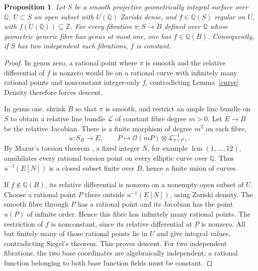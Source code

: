 \documentclass[11pt]{article}
\newtheorem{proposition}[theorem]{Proposition}
\theoremstyle{remark}\newtheorem{remark}[theorem]{Remark}
\newcommand{\Q}{\mathbb Q}\newcommand{\Z}{\mathbb Z}\newcommand{\R}{\mathbb R}
\begin{document}
\begin{proposition}\label{genus-one}
Let \(S\) be a smooth projective geometrically integral surface over \(\Q\), \(U\subset S\) an open subset with \(U(\Q)\) Zariski dense, and \(f\in\Q(S)\) regular on \(U\), with \(f(U(\Q))\subseteq\Z\). For every fibration \(\pi:S\to B\) defined over \(\Q\) whose geometric generic fibre has genus at most one, one has \(f\in\Q(B)\). Consequently, if \(S\) has two independent such fibrations, \(f\) is constant.
\end{proposition}
\begin{proof}
In genus zero, a rational point where \(\pi\) is smooth and the relative differential of \(f\) is nonzero would lie on a rational curve with infinitely many rational points and nonconstant integer-only \(f\), contradicting Lemma~\ref{curve}. Density therefore forces descent.

In genus one, shrink \(B\) so that \(\pi\) is smooth, and restrict an ample line bundle on \(S\) to obtain a relative line bundle \(\mathcal L\) of constant fibre degree \(m>0\). Let \(E\to B\) be the relative Jacobian. There is a finite morphism of degree \(m^2\) on each fibre,
\[
 u:S_B\longrightarrow E,\qquad
 P\longmapsto\mathcal O(mP)\otimes\mathcal L_{\pi(P)}^{-1}.
\]
By Mazur's torsion theorem \cite{Mazur}, a fixed integer \(N\), for example \(\operatorname{lcm}(1,\ldots,12)\), annihilates every rational torsion point on every elliptic curve over \(\Q\). Thus \(u^{-1}(E[N])\) is a closed subset finite over \(B\), hence a finite union of curves.

If \(f\notin\Q(B)\), its relative differential is nonzero on a nonempty open subset of \(U\). Choose a rational point \(P\) there outside \(u^{-1}(E[N])\), using Zariski density. The smooth fibre through \(P\) has a rational point and its Jacobian has the point \(u(P)\) of infinite order. Hence this fibre has infinitely many rational points. The restriction of \(f\) is nonconstant, since its relative differential at \(P\) is nonzero. All but finitely many of those rational points lie in \(U\) and give integral values, contradicting Siegel's theorem. This proves descent. For two independent fibrations, the two base coordinates are algebraically independent; a rational function belonging to both base function fields must be constant.
\end{proof}
\end{document}
